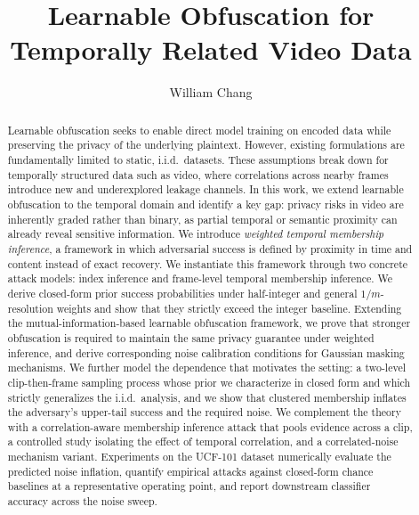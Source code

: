 \documentclass[sigconf,anonymous, review]{acmart}
\begin{document}
\title{Learnable Obfuscation for Temporally Related Video Data}

\author{William Chang}

\renewcommand{\shortauthors}{Chang}

\begin{abstract}
Learnable obfuscation seeks to enable direct model training on encoded data while preserving the privacy of the underlying plaintext. However, existing formulations are fundamentally limited to static, i.i.d.\ datasets. These assumptions break down for temporally structured data such as video, where correlations across nearby frames introduce new and underexplored leakage channels.
In this work, we extend learnable obfuscation to the temporal domain and identify a key gap: privacy risks in video are inherently graded rather than binary, as partial temporal or semantic proximity can already reveal sensitive information.
We introduce \emph{weighted temporal membership inference}, a framework in which adversarial success is defined by proximity in time and content instead of exact recovery. We instantiate this framework through two concrete attack models: index inference and frame-level temporal membership inference. We derive closed-form prior success probabilities under half-integer and general $1/m$-resolution weights and show that they strictly exceed the integer baseline. Extending the mutual-information-based learnable obfuscation framework, we prove that stronger obfuscation is required to maintain the same privacy guarantee under weighted inference, and derive corresponding noise calibration conditions for Gaussian masking mechanisms. We further model the dependence that motivates the setting: a two-level clip-then-frame sampling process whose prior we characterize in closed form and which strictly generalizes the i.i.d.\ analysis, and we show that clustered membership inflates the adversary's upper-tail success and the required noise. We complement the theory with a correlation-aware membership inference attack that pools evidence across a clip, a controlled study isolating the effect of temporal correlation, and a correlated-noise mechanism variant. Experiments on the UCF-101 dataset numerically evaluate the predicted noise inflation, quantify empirical attacks against closed-form chance baselines at a representative operating point, and report downstream classifier accuracy across the noise sweep.
\end{abstract}
\end{document}

